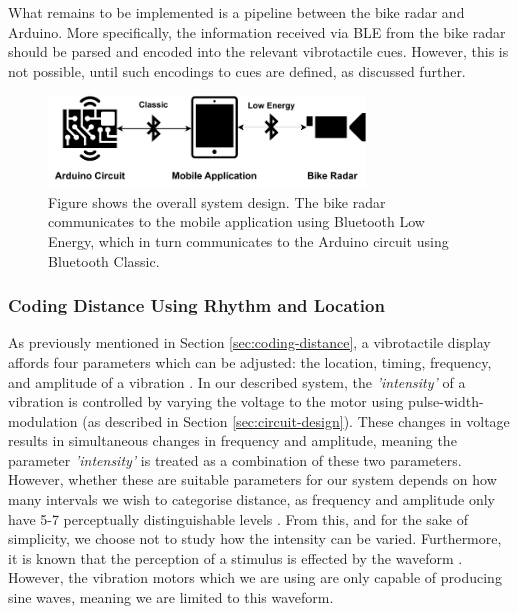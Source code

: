\documentclass{interim}
\begin{document}
What remains to be implemented is a pipeline between the bike radar and Arduino. More specifically, the information received via BLE from the bike radar should be parsed and encoded into the relevant vibrotactile cues. However, this is not possible, until such encodings to cues are defined, as discussed further.

\begin{figure}[ht]
    \centering
    \includegraphics[width=0.75\textwidth]{images/overall-system.pdf}
    \caption{Figure shows the overall system design. The bike radar communicates to the mobile application using Bluetooth Low Energy, which in turn communicates to the Arduino circuit using Bluetooth Classic.}
    \label{fig:overall-system}
\end{figure}


\subsubsection{Coding Distance Using Rhythm and Location}
As previously mentioned in Section \ref{sec:coding-distance}, a vibrotactile display affords four parameters which can be adjusted: the location, timing, frequency, and amplitude of a vibration \cite{guidelines}. In our described system, the \textit{'intensity'} of a vibration is controlled by varying the voltage to the motor using pulse-width-modulation (as described in Section \ref{sec:circuit-design}). These changes in voltage results in simultaneous changes in frequency and amplitude, meaning the parameter \textit{'intensity'} is treated as a combination of these two parameters. However, whether these are suitable parameters for our system depends on how many intervals we wish to categorise distance, as frequency and amplitude only have 5-7 perceptually distinguishable levels \cite{guidelines}. From this, and for the sake of simplicity, we choose not to study how the intensity can be varied. Furthermore, it is known that the perception of a stimulus is effected by the waveform \cite{guidelines}. However, the vibration motors which we are using are only capable of producing sine waves, meaning we are limited to this waveform.
\end{document}
